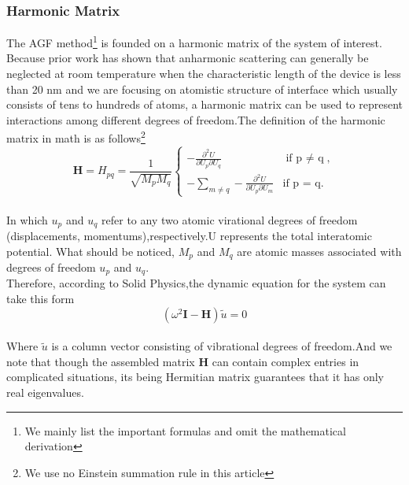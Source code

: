 \subsubsection*{Harmonic Matrix}
The AGF method\footnote{We mainly list the important formulas and omit the mathematical derivation} is founded on a harmonic matrix of the system of interest. Because prior work has shown that anharmonic scattering can generally be neglected at room temperature when the characteristic length of the device is less than 20 nm and we are focusing on atomistic structure of interface which usually consists of tens to hundreds of atoms, a harmonic matrix can be used to represent interactions among different degrees of freedom.The definition of the harmonic matrix in math is as follows\footnote{We use no Einstein summation rule in this article}
\begin{equation}
\textbf{H}={H_{pq}}=\frac{1}{\sqrt{M_p M_q}}\left\{\begin{array}{ll}
-\frac{\partial^2 U}{\partial U_p \partial U_q}&  \text{if p $\neq$ q},\\
-\sum_{m \neq q} -\frac{\partial^2 U}{\partial U_p \partial U_m} & \text{if p = q}.
\end{array}\right. \label{con:harmonic}
\end{equation}\\
In which $u_p$ and $u_q$ refer to any two atomic virational degrees of freedom (displacements,
momentums),respectively.U represents the total interatomic potential. What should be noticed, $M_p$ and $M_q$ are atomic masses associated with degrees of freedom $u_p$ and $u_q$. \\
Therefore, according to Solid Physics\cite{Ashcroft},the dynamic equation for the system can take this form
\begin{equation}
(\omega^2 \textbf{I}-\textbf{H})\tilde{u} = 0 \label{con:dynamic} 
\end{equation}\\
Where $\tilde{u}$ is a column vector consisting of vibrational degrees of freedom.And we note that though the assembled matrix $\textbf{H}$ can contain complex entries in complicated situations, its being Hermitian matrix guarantees that it has only real eigenvalues.

